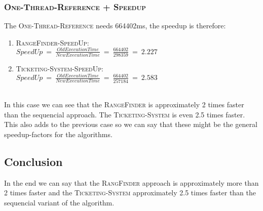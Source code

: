 \documentclass{article}
\begin{document}
\begin{adjustwidth}{2em}{2em}
\begin{adjustwidth}{2em}{2em}
			\subsubsection*{\textsc{One-Thread-Reference + Speedup}}
			\begin{adjustwidth}{1em}{}
				The \textsc{One-Thread-Reference} needs 664402ms, the speedup is therefore: \\
				\begin{enumerate}[]
					\item \textsc{RangeFinder-SpeedUp}: \\
					$\textit{SpeedUp} \ = \ \frac{\textit{OldExecutionTime}}{\textit{NewExecutionTime}} \ = \ \frac{664402}{298359} \ = \ 2.227$
					\item \textsc{Ticketing-System-SpeedUp}: \\
					$\textit{SpeedUp} \ = \ \frac{\textit{OldExecutionTime}}{\textit{NewExecutionTime}} \ = \ \frac{664402}{257184} \ = \ 2.583$
				\end{enumerate}
				\hfill \\
				In this case we can see that the \textsc{RangeFinder} is approximately 2 times faster than the sequencial approach. The \textsc{Ticketing-System} is even 2.5 times faster. This also adds to the previous case so we can say that these might be the general speedup-factors for the algorithms.
			\end{adjustwidth}
		\end{adjustwidth}
		
		\subsection*{Conclusion}
		In the end we can say that the \textsc{RangFinder} approach is approximately more than 2 times faster and the \textsc{Ticketing-System} approximately 2.5 times faster than the sequencial variant of the algorithm.
	\end{adjustwidth}	
\end{document}
